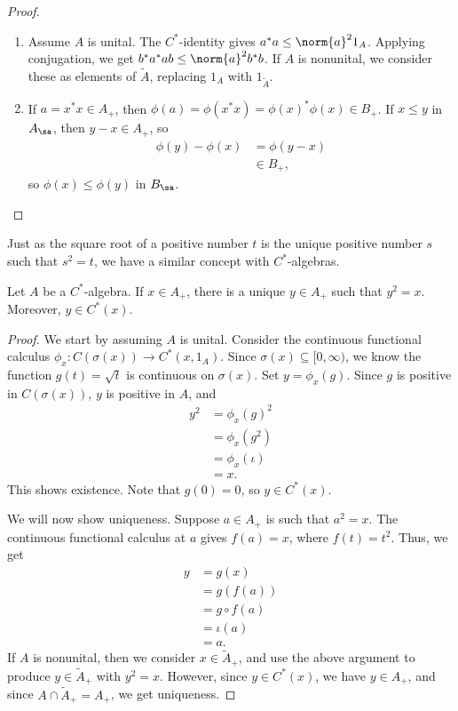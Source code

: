 \documentclass[10pt]{mypackage}
\begin{document}
\begin{proof}
\begin{enumerate}[(1)]
    \item Assume $A$ is unital. The $C^{\ast}$-identity gives $a^{\ast}a \leq \norm{a}^21_A$. Applying conjugation, we get $b^{\ast}a^{\ast}ab\leq \norm{a}^2b^{\ast}b$. If $A$ is nonunital, we consider these as elements of $\widetilde{A}$, replacing $1_A$ with $1_{\widetilde{A}}$.
    \item If $a = x^{\ast}x\in A_{+}$, then $\phi\left(a\right) = \phi\left(x^{\ast}x\right) = \phi\left(x\right)^{\ast}\phi\left(x\right)\in B_{+}$. If $x\leq y$ in $A_{\sa}$, then $y-x\in A_{+}$, so
      \begin{align*}
        \phi\left(y\right) - \phi\left(x\right) &= \phi\left(y-x\right)\\
                                                &\in B_{+},
      \end{align*}
      so $\phi\left(x\right)\leq \phi\left(y\right)$ in $B_{\sa}$.
  \end{enumerate}
\end{proof}
Just as the square root of a positive number $t$ is the unique positive number $s$ such that $s^2 = t$, we have a similar concept with $C^{\ast}$-algebras.
\begin{proposition}
  Let $A$ be a $C^{\ast}$-algebra. If $x\in A_{+}$, there is a unique $y\in A_{+}$ such that $y^2 = x$. Moreover, $y\in C^{\ast}\left(x\right)$.
\end{proposition}
\begin{proof}
  We start by assuming $A$ is unital. Consider the continuous functional calculus $\phi_x\colon C\left(\sigma\left(x\right)\right)\rightarrow C^{\ast}\left(x,1_A\right)$. Since $\sigma\left(x\right)\subseteq [0,\infty)$, we know the function $g(t) = \sqrt{t}$ is continuous on $\sigma\left(x\right)$. Set $y = \phi_x\left(g\right)$. Since $g$ is positive in $C\left(\sigma\left(x\right)\right)$, $y$ is positive in $A$, and
  \begin{align*}
    y^2 &= \phi_x\left(g\right)^2\\
        &= \phi_x\left(g^2\right)\\
        &= \phi_x\left(\iota\right)\\
        &= x.
  \end{align*}
  This shows existence. Note that $g(0) = 0$, so $y\in C^{\ast}\left(x\right)$.\newline

  We will now show uniqueness. Suppose $a\in A_{+}$ is such that $a^2 = x$. The continuous functional calculus at $a$ gives $f(a) = x$, where $f(t) = t^2$. Thus, we get
  \begin{align*}
    y &= g(x)\\
      &= g\left(f\left(a\right)\right)\\
      &= g\circ f\left(a\right)\\
      &= \iota\left(a\right)\\
      &= a.
  \end{align*}
  If $A$ is nonunital, then we consider $x\in \widetilde{A}_+$, and use the above argument to produce $y\in \widetilde{A}_{+}$ with $y^2 = x$. However, since $y\in C^{\ast}\left(x\right)$, we have $y\in A_{+}$, and since $A\cap \widetilde{A}_+ = A_+$, we get uniqueness.
\end{proof}
\end{document}
